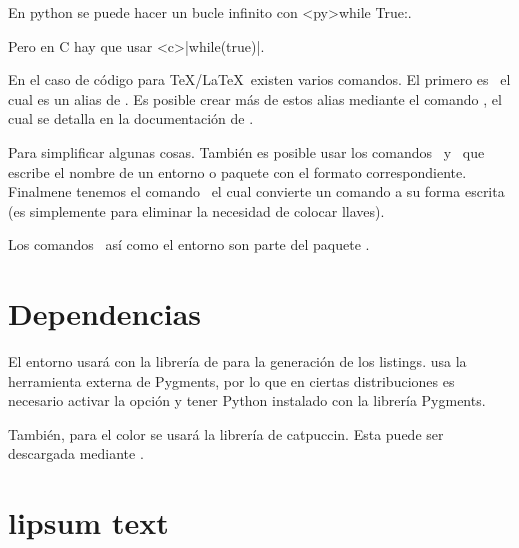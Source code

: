 \documentclass[theme=mocha, pagecolor, pagesize=a5paper, stretchmode=true]{qx-files/qx-notes}
\begin{document}
  \begin{texexample}
    En python se puede hacer un bucle infinito con 
    \codeline<py>{while True:}.

    Pero en C hay que usar \codeline<c>|while(true){}|.
  \end{texexample}


  En el caso de código para \TeX/\LaTeX\ existen varios comandos. El primero es \texcs\texline\ el cual es un alias de . Es posible crear más de estos alias mediante el comando \texcs\newmintinline, el cual se detalla en la documentación de .

  Para simplificar algunas cosas. También es posible usar los comandos \texcs\texenvname\ y \texcs\texpkgname\ que escribe el nombre de un entorno o paquete con el formato correspondiente. Finalmene tenemos el comando \texcs\texcs\ el cual convierte un comando a su forma escrita (es simplemente para eliminar la necesidad de colocar llaves).

  \begin{texexample}
    Los comandos \texcs\mint\ así como el entorno
     son parte del paquete .
  \end{texexample}

  \section{Dependencias}

  El entorno  usará  con la librería de  para la generación de los listings.  usa la herramienta externa de Pygments, por lo que en ciertas distribuciones es necesario activar la opción  y tener Python instalado con la librería Pygments.

  También, para el color se usará la librería de catpuccin. Esta puede ser descargada mediante .




  \section{lipsum text}

  \lipsum
\end{document}
